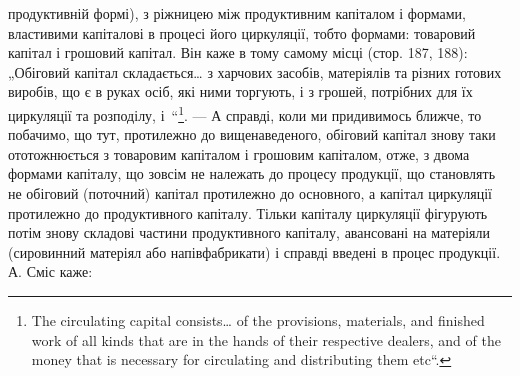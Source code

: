 \parcont{}  %
продуктивній формі), з ріжницею між продуктивним капіталом і формами,
властивими капіталові в процесі його циркуляції, тобто формами: товаровий
капітал і грошовий капітал. Він каже в тому самому місці (стор.
187, 188): „Обіговий капітал складається\dots{} з харчових засобів, матеріялів
та різних готових виробів, що є в руках осіб, які ними торгують, і з
грошей, потрібних для їх циркуляції та розподілу, і~“\footnote*{
The circulating capital consists\dots{} of the provisions, materials, and finished work
of all kinds that are in the hands of their respective dealers, and of the money
that is necessary for circulating and distributing them etc“.
}. — А справді,
коли ми придивимось ближче, то побачимо, що тут, протилежно до вищенаведеного,
обіговий капітал знову таки ототожнюється з товаровим
капіталом і грошовим капіталом, отже, з двома формами капіталу, що зовсім
не належать до процесу продукції, що становлять не обіговий (поточний)
капітал протилежно до основного, а капітал циркуляції протилежно до продуктивного
капіталу. Тільки  капіталу циркуляції фігурують потім
знову складові частини продуктивного капіталу, авансовані на матеріяли
(сировинний матеріял або напівфабрикати) і справді введені в процес продукції.
А. Сміс каже:

